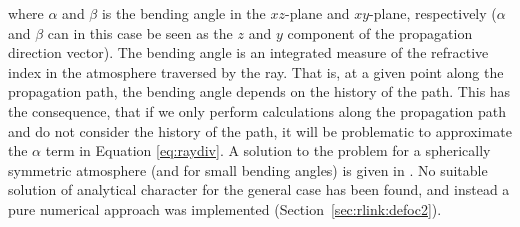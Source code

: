 where \(\alpha\) and \(\beta\) is the bending angle in the \(xz\)-plane and
\(xy\)-plane, respectively (\(\alpha\) and \(\beta\) can in this case be seen
as the \(z\) and \(y\) component of the propagation direction vector). The
bending angle is an integrated measure of the refractive index in the
atmosphere traversed by the ray. That is, at a given point along the
propagation path, the bending angle depends on the history of the path. This
has the consequence, that if we only perform calculations along the propagation
path and do not consider the history of the path, it will be problematic to
approximate the \(\alpha\) term in Equation \ref{eq:raydiv}. A solution to the
problem for a spherically symmetric atmosphere (and for small bending angles)
is given in \citet{haugstad:78:turbu}. No suitable solution of analytical
character for the general case has been found, and instead a pure numerical
approach was implemented (Section~\ref{sec:rlink:defoc2}).


